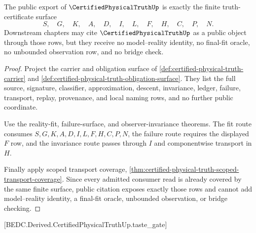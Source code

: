 \begin{theorem}
\label{thm:certified-physical-truth-public-export}
The public export of $\CertifiedPhysicalTruthUp$ is exactly the finite truth-certificate surface
$$
S,\quad G,\quad K,\quad A,\quad D,\quad I,\quad L,\quad F,\quad H,\quad C,\quad P,\quad N .
$$
Downstream chapters may cite $\CertifiedPhysicalTruthUp$ as a public object through those rows, but they receive no model--reality identity, no final-fit oracle, no unbounded observation row, and no bridge check.
\end{theorem}
\begin{proof}
Project the carrier and obligation surface of \autoref{def:certified-physical-truth-carrier} and \autoref{def:certified-physical-truth-obligation-surface}. They list the full source, signature, classifier, approximation, descent, invariance, ledger, failure, transport, replay, provenance, and local naming rows, and no further public coordinate.

Use the reality-fit, failure-surface, and observer-invariance theorems. The fit route consumes $S,G,K,A,D,I,L,F,H,C,P,N$, the failure route requires the displayed $F$ row, and the invariance route passes through $I$ and componentwise transport in $H$.

Finally apply scoped transport coverage, \autoref{thm:certified-physical-truth-scoped-transport-coverage}. Since every admitted consumer read is already covered by the same finite surface, public citation exposes exactly those rows and cannot add model--reality identity, a final-fit oracle, unbounded observation, or bridge checking.
\end{proof}

[BEDC.Derived.CertifiedPhysicalTruthUp.taste\_gate]

\begin{closurestatus}{\CertifiedPhysicalTruthUp}
  \theoryclosure{\matureClosure}
  \formalstatus{\theoremCheckedV}
\end{closurestatus}
